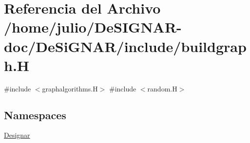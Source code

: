 \hypertarget{buildgraph_8_h}{}\section{Referencia del Archivo /home/julio/\+De\+S\+I\+G\+N\+A\+R-\/doc/\+De\+Si\+G\+N\+A\+R/include/buildgraph.H}
\label{buildgraph_8_h}
{\ttfamily \#include $<$graphalgorithms.\+H$>$}\newline
{\ttfamily \#include $<$random.\+H$>$}\newline
\subsection*{Namespaces}
\begin{DoxyCompactItemize}
\item 
 \hyperlink{namespace_designar}{Designar}
\end{DoxyCompactItemize}
